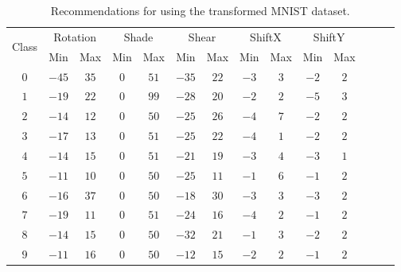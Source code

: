 




\begin{center}
 \begin{table}[ht]
  \centering
    \begin{tabular}{|c|c|c|c|c|c|c|c|c|c|c|c|c|c|}
    \hline
     \multirow{2}{*}{Class} & \multicolumn{2}{c|}{Rotation} & \multicolumn{2}{c|}{Shade} & \multicolumn{2}{c|}{Shear} & \multicolumn{2}{c|}{ShiftX} & \multicolumn{2}{c|}{ShiftY} \\\cline{2-11} 
     & Min & Max & Min & Max & Min & Max & Min & Max & Min & Max \\
     \hline
    $0$ & $-45$ & $35$ & $0$ & $51$ & $-35$ & $22$ & $-3$ & $3$ & $-2$ & $2$  \\
    $1$ & $-19$ & $22$ & $0$ & $99$ & $-28$ & $20$ & $-2$ & $2$ & $-5$ & $3$  \\
    $2$ & $-14$ & $12$ & $0$ & $50$ & $-25$ & $26$ & $-4$ & $7$ & $-2$ & $2$  \\
    $3$ & $-17$ & $13$ & $0$ & $51$ & $-25$ & $22$ & $-4$ & $1$ & $-2$ & $2$  \\
    $4$ & $-14$ & $15$ & $0$ & $51$ & $-21$ & $19$ & $-3$ & $4$ & $-3$ & $1$  \\
    $5$ & $-11$ & $10$ & $0$ & $50$ & $-25$ & $11$ & $-1$ & $6$ & $-1$ & $2$  \\
    $6$ & $-16$ & $37$ & $0$ & $50$ & $-18$ & $30$ & $-3$ & $3$ & $-3$ & $2$  \\
    $7$ & $-19$ & $11$ & $0$ & $51$ & $-24$ & $16$ & $-4$ & $2$ & $-1$ & $2$  \\
    $8$ & $-14$ & $15$ & $0$ & $50$ & $-32$ & $21$ & $-1$ & $3$ & $-2$ & $2$  \\
    $9$ & $-11$ & $16$ & $0$ & $50$ & $-12$ & $15$ & $-2$ & $2$ & $-1$ & $2$  \\
    \hline
    \end{tabular}
    \caption{Recommendations for using the transformed MNIST dataset.}
    \label{tbl:indexrecommendations}
   \end{table}   
\end{center}

